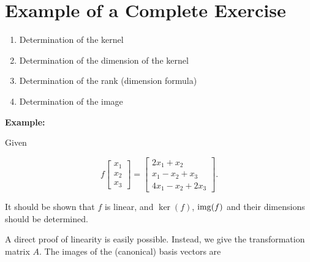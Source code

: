 \section{Example of a Complete Exercise}

\begin{enumerate}

    \item Determination of the kernel

    \item Determination of the dimension of the kernel

    \item Determination of the rank (dimension formula)

    \item Determination of the image

\end{enumerate}

\textbf{Example:}

Given

\[
    f\begin{bmatrix}
        x_1 \\
        x_2 \\
        x_3
    \end{bmatrix} =
    \begin{bmatrix}
        2x_1 + x_2      \\
        x_1 - x_2 + x_3 \\
        4x_1 - x_2 + 2x_3
    \end{bmatrix} .
\]

It should be shown that \(f\) is linear, and \(\ker(f)\), \(\mathrm{img}(f)\) and their dimensions should be determined.

A direct proof of linearity is easily possible. Instead, we give the transformation matrix \(A\). The images of the (canonical) basis vectors are

